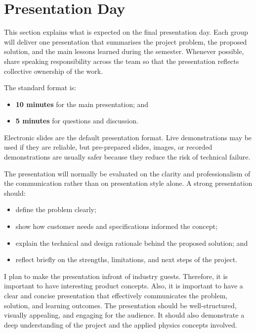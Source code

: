 \section{Presentation Day}

This section explains what is expected on the final presentation day. Each group will deliver one presentation that summarises the project problem, the proposed solution, and the main lessons learned during the semester. Whenever possible, share speaking responsibility across the team so that the presentation reflects collective ownership of the work.

The standard format is:
\begin{itemize}
    \item \textbf{10 minutes} for the main presentation; and
    \item \textbf{5 minutes} for questions and discussion.
\end{itemize}

Electronic slides are the default presentation format. Live demonstrations may be used if they are reliable, but pre-prepared slides, images, or recorded demonstrations are usually safer because they reduce the risk of technical failure.

The presentation will normally be evaluated on the clarity and professionalism of the communication rather than on presentation style alone. A strong presentation should:
\begin{itemize}
    \item define the problem clearly;
    \item show how customer needs and specifications informed the concept;
    \item explain the technical and design rationale behind the proposed solution; and
    \item reflect briefly on the strengths, limitations, and next steps of the project.
\end{itemize}

I plan to make the presentation infront of industry  guests. Therefore, 
it is important to have interesting product concepts. Also, it is important to have a clear and concise presentation that effectively communicates the problem, solution, and learning outcomes. The presentation should be well-structured, visually appealing, and engaging for the audience. It should also demonstrate a deep understanding of the project and the applied physics concepts involved.
